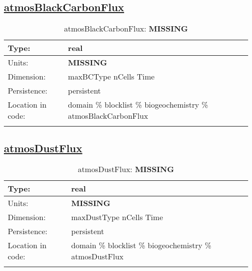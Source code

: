 \subsection[atmosBlackCarbonFlux]{\hyperref[sec:var_tab_biogeochemistry]{atmosBlackCarbonFlux}}
\label{subsec:var_sec_biogeochemistry_atmosBlackCarbonFlux}
\begin{center}
\begin{longtable}{| p{2.0in} | p{4.0in} |}
        \hline 
        Type: & real \\
        \hline 
        Units: & {\bf \color{red} MISSING} \\
        \hline 
        Dimension: & maxBCType nCells Time \\
        \hline 
        Persistence: & persistent \\
        \hline 
         Location in code: & domain \% blocklist \% biogeochemistry \% atmosBlackCarbonFlux \\
         \hline 
    \caption{atmosBlackCarbonFlux: {\bf \color{red} MISSING}}
\end{longtable}
\end{center}
\subsection[atmosDustFlux]{\hyperref[sec:var_tab_biogeochemistry]{atmosDustFlux}}
\label{subsec:var_sec_biogeochemistry_atmosDustFlux}
\begin{center}
\begin{longtable}{| p{2.0in} | p{4.0in} |}
        \hline 
        Type: & real \\
        \hline 
        Units: & {\bf \color{red} MISSING} \\
        \hline 
        Dimension: & maxDustType nCells Time \\
        \hline 
        Persistence: & persistent \\
        \hline 
         Location in code: & domain \% blocklist \% biogeochemistry \% atmosDustFlux \\
         \hline 
    \caption{atmosDustFlux: {\bf \color{red} MISSING}}
\end{longtable}
\end{center}
